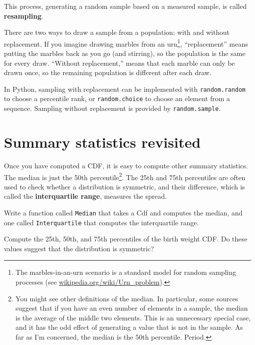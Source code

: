 \documentclass[12pt]{book}
\begin{document}
This process, generating a random sample based on a measured sample,
is called {\bf resampling}.


There are two ways to draw a sample from a population: with and
without replacement.  If you imagine drawing marbles from an
urn\footnote{The marbles-in-an-urn scenario is a standard model for
  random sampling processes (see
  \url{wikipedia.org/wiki/Urn_problem}).}, ``replacement'' means
putting the marbles back as you go (and stirring), so the population
is the same for every draw.  ``Without replacement,'' means that each
marble can only be drawn once, so the remaining population is
different after each draw.

In Python, sampling with replacement can be implemented with
{\tt random.random} to choose a percentile rank, or {\tt random.choice}
to choose an element from a sequence.  Sampling without replacement
is provided by {\tt random.sample}.



\section{Summary statistics revisited}

Once you have computed a CDF, it is easy to compute other summary
statistics.  The median is just the 50th percentile\footnote{You might
see other definitions of the median.  In particular,
some sources suggest that if you have an even number of elements in
a sample, the median is the average of the middle two elements.
This is an unnecessary special case, and it has the odd effect of
generating a value that is not in the sample.  As far
as I'm concerned, the median is the 50th percentile.  Period.}.
The 25th and 75th percentiles are often used to check whether
a distribution is symmetric, and their difference, which is called
the {\bf interquartile range}, measures the spread.

\begin{ex}

Write a function called {\tt Median} that takes a Cdf and computes the
median, and one called {\tt Interquartile} that computes
the interquartile range.

Compute the 25th, 50th, and 75th percentiles of the birth weight
CDF.  Do these values suggest that the distribution is symmetric?



\end{ex}
\end{document}
